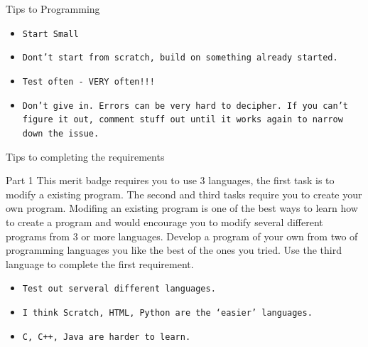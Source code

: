 \documentclass[10pt]{beamer}
\begin{document}
{%

\begin{frame}{Tips to Programming}{}
\begin{block}{}
  \begin{itemize}
    \item {\tt Start Small}
    \item {\tt Dont't start from scratch, build on something already started.}
    \item {\tt Test often - VERY often!!!}
    \item {\tt Don't give in.  Errors can be very hard to decipher.  If you can't figure it out, comment stuff out until it works again to narrow down the issue.}
    \end{itemize}
  \end{block}
\end{frame}


\begin{frame}{Tips to completing the requirements}{}
\begin{block}{Part 1}
This merit badge requires you to use 3 languages, the first task is to modify a existing program.  The second and third tasks require you to create your own program.  Modifing an existing program is one of the best ways to learn how to create a program and would encourage you to modify several different programs from 3 or more languages.  Develop a program of your own from two of programming languages you like the best of the ones you tried.  Use the third language to complete the first requirement.
  \begin{itemize}
    \item {\tt Test out serveral different languages.}
    \item {\tt I think Scratch, HTML, Python are the `easier' languages.}
    \item {\tt C, C++, Java are harder to learn.}
    \end{itemize}
  \end{block}
\end{frame}


}
\end{document}
